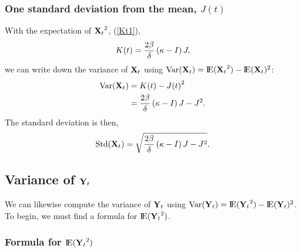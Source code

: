 \subsubsection{One standard deviation from the mean, $J(t)$}
With the expectation of ${{\bf X}_t}^2$, (\ref{Kt1}), 
\begin{equation*}
K(t) = \frac{2\beta}{\delta}\left(\kappa- I\right) J,
\end{equation*}
we can write down the variance of ${{\bf X}_t}$ using $\text{Var}({{\bf X}_t}) = {\rm I}\!{\rm E}({{\bf X}_t}^2) - {\rm I}\!{\rm E}({{\bf X}_t})^2$:
\begin{align*}
\text{Var}({{\bf X}_t}) &= K(t) - {J(t)}^2\\
&= \frac{2\beta}{\delta}\left(\kappa - I\right) J - J^2.
\end{align*}
The standard deviation is then,
\begin{equation*}
\text{Std}({{\bf X}_t}) = \sqrt{\frac{2\beta}{\delta}\left(\kappa- I\right) J - J^2}.
\end{equation*}



\subsection{Variance of ${{\bf Y}_t}$}

We can likewise compute the variance of ${{\bf Y}_t}$ using $\text{Var}({{\bf Y}_t}) = {\rm I}\!{\rm E}({{\bf Y}_t}^2) - {\rm I}\!{\rm E}({{\bf Y}_t})^2$. To begin, we must find a formula for ${\rm I}\!{\rm E}({{\bf Y}_t}^2)$.


\subsubsection{Formula for ${\rm I}\!{\rm E}({{\bf Y}_t}^2)$}


